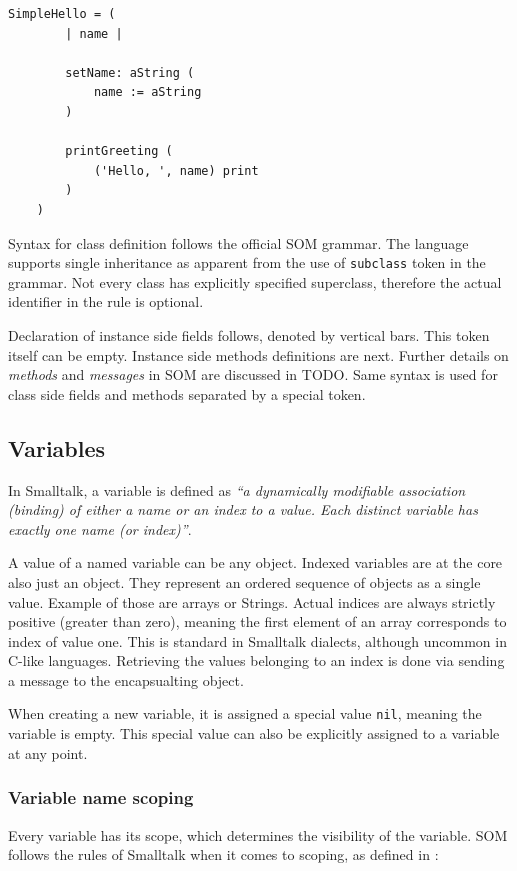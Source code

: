 \documentclass[thesis=M,english]{FITthesis}[2019/12/23]
\begin{document}
\begin{lstlisting}[language=Smalltalk]
	SimpleHello = (
		| name |

		setName: aString (
			name := aString
		)

		printGreeting (
			('Hello, ', name) print
		)
	)
\end{lstlisting}

Syntax for class definition follows the official SOM grammar. The language supports single inheritance as apparent from the use
of \texttt{subclass} token in the grammar. Not every class has explicitly specified superclass, therefore the actual identifier in
the rule is optional.

Declaration of instance side fields follows, denoted by vertical bars. This token itself can be empty. Instance side methods definitions
are next. Further details on \textit{methods} and \textit{messages} in SOM are discussed in TODO. %
Same syntax is used for class side fields and methods separated by a special token.

\subsection{Variables}
In Smalltalk, a variable is defined as \textit{``a dynamically modifiable association (binding) of either a name
or an index to a value. Each distinct variable has exactly one name (or index)''}\cite{smalltalk-essentials}.

A value of a named variable can be any object. Indexed variables are at the core also just an object. They
represent an ordered sequence of objects as a single value. Example of those are arrays or Strings. Actual
indices are always strictly positive (greater than zero), meaning the first element of an array corresponds
to index of value one. This is standard in Smalltalk dialects, although uncommon in C-like languages. Retrieving
the values belonging to an index is done via sending a message to the encapsualting object.

When creating a new variable, it is assigned a special value \texttt{nil}, meaning the variable is empty. This
special value can also be explicitly assigned to a variable at any point.

\subsubsection{Variable name scoping}
Every variable has its scope, which determines the visibility of the variable. SOM follows the rules of Smalltalk
when it comes to scoping, as defined in \cite{smalltalk-essentials}:
\end{document}
